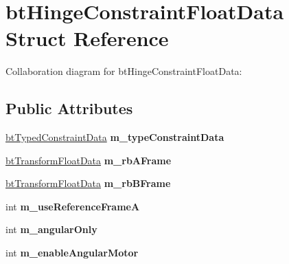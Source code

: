 \hypertarget{structbt_hinge_constraint_float_data}{\section{bt\+Hinge\+Constraint\+Float\+Data Struct Reference}
\label{structbt_hinge_constraint_float_data}
}


Collaboration diagram for bt\+Hinge\+Constraint\+Float\+Data\+:
\subsection*{Public Attributes}
\begin{DoxyCompactItemize}
\item 
\hypertarget{structbt_hinge_constraint_float_data_a7b74d6d5a79ffac88c2f9e9fcb175664}{\hyperlink{structbt_typed_constraint_data}{bt\+Typed\+Constraint\+Data} {\bfseries m\+\_\+type\+Constraint\+Data}}\label{structbt_hinge_constraint_float_data_a7b74d6d5a79ffac88c2f9e9fcb175664}

\item 
\hypertarget{structbt_hinge_constraint_float_data_a927d18027e11b37a4b4c787d64f7a002}{\hyperlink{structbt_transform_float_data}{bt\+Transform\+Float\+Data} {\bfseries m\+\_\+rb\+A\+Frame}}\label{structbt_hinge_constraint_float_data_a927d18027e11b37a4b4c787d64f7a002}

\item 
\hypertarget{structbt_hinge_constraint_float_data_ac5eaea04ef072e1bf05f503f1c941164}{\hyperlink{structbt_transform_float_data}{bt\+Transform\+Float\+Data} {\bfseries m\+\_\+rb\+B\+Frame}}\label{structbt_hinge_constraint_float_data_ac5eaea04ef072e1bf05f503f1c941164}

\item 
\hypertarget{structbt_hinge_constraint_float_data_abb682225c36bda47d3540266302187d1}{int {\bfseries m\+\_\+use\+Reference\+Frame\+A}}\label{structbt_hinge_constraint_float_data_abb682225c36bda47d3540266302187d1}

\item 
\hypertarget{structbt_hinge_constraint_float_data_afa70b3fa08affad9d05e4a4455a1767a}{int {\bfseries m\+\_\+angular\+Only}}\label{structbt_hinge_constraint_float_data_afa70b3fa08affad9d05e4a4455a1767a}

\item 
\hypertarget{structbt_hinge_constraint_float_data_ac9cb6ef85c7b6b99d9420823779a79ac}{int {\bfseries m\+\_\+enable\+Angular\+Motor}}\label{structbt_hinge_constraint_float_data_ac9cb6ef85c7b6b99d9420823779a79ac}


\end{DoxyCompactItemize}
